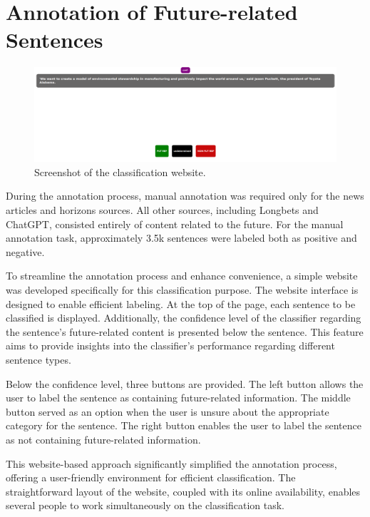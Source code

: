 \documentclass[a4paper,10pt]{report} %
\begin{document}
\section{Annotation of Future-related Sentences}
\begin{figure}
  \centering
  \includegraphics[width=16cm]{img/classification_website.png}
  \caption{Screenshot of the classification website.}
  \label{fig:classification_website}
\end{figure}
During the annotation process, manual annotation was required only for the news articles and horizons sources. All other sources, including Longbets and ChatGPT, consisted entirely of content related to the future. For the manual annotation task, approximately 3.5k sentences were labeled both as positive and negative.

To streamline the annotation process and enhance convenience, a simple website was developed specifically for this classification purpose. The website interface is designed to enable efficient labeling. At the top of the page, each sentence to be classified is displayed. Additionally, the confidence level of the classifier regarding the sentence's future-related content is presented below the sentence. This feature aims to provide insights into the classifier's performance regarding different sentence types.

Below the confidence level, three buttons are provided. The left button allows the user to label the sentence as containing future-related information. The middle button served as an option when the user is unsure about the appropriate category for the sentence. The right button enables the user to label the sentence as not containing future-related information.

This website-based approach significantly simplified the annotation process, offering a user-friendly environment for efficient classification. The straightforward layout of the website, coupled with its online availability, enables several people to work simultaneously on the classification task.
\end{document}
